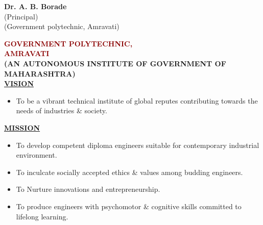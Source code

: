 \documentclass[12pt,a4paper]{article}
\begin{document}
\vspace{10mm}

\begin{center}
  \textbf{Dr. A. B. Borade}\\[1mm]
  (Principal)\\[1mm]
  (Government polytechnic, Amravati)
\end{center}
\vspace{5mm}
\clearpage




\thispagestyle{empty}

\vspace*{-5mm}
\begin{center}
  {\fontsize{18}{22}\selectfont \bfseries \textcolor{darkred}{GOVERNMENT POLYTECHNIC,}\\[2mm]
  \textcolor{darkred}{AMRAVATI}}\\[3mm]
  {\fontsize{10}{13}\selectfont \bfseries (AN AUTONOMOUS INSTITUTE OF GOVERNMENT OF MAHARASHTRA)}\\[8mm]
  
  {\fontsize{13}{16}\selectfont \bfseries \underline{VISION}}\\[3mm]
\end{center}
\begin{itemize}[leftmargin=12mm, label=\textbullet]
  \item To be a vibrant technical institute of global reputes contributing towards the needs of industries \& society.
\end{itemize}

\begin{center}
  \vspace{4mm}
  {\fontsize{13}{16}\selectfont \bfseries \underline{MISSION}}\\[3mm]
\end{center}
\begin{itemize}[leftmargin=12mm, label=\textbullet]
  \item To develop competent diploma engineers suitable for contemporary industrial environment.
  \item To inculcate socially accepted ethics \& values among budding engineers.
  \item To Nurture innovations and entrepreneurship.
  \item To produce engineers with psychomotor \& cognitive skills committed to lifelong learning.
\end{itemize}
\end{document}
